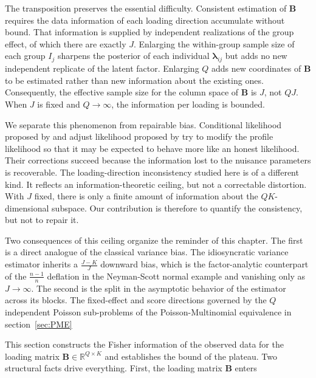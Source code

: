 The transposition preserves the essential difficulty. Consistent estimation of $\mathbf{B}$ requires the data information of each loading direction accumulate without bound. That information is supplied by independent realizations of the group effect, of which there are exactly $J$. Enlarging the within-group sample size of each group $I_{j}$ sharpens the posterior of each individual $\bm{\lambda}_{ij}$ but adds no new independent replicate of the latent factor. Enlarging $Q$ adds new coordinates of $\mathbf{B}$ to be estimated rather than new information about the existing ones. Consequently, the effective sample size for the column space of $\mathbf{B}$ is $J$, not $QJ$. When $J$ is fixed and $Q\to\infty$, the information per loading is bounded.

We separate this phenomenon from repairable bias. Conditional likelihood proposed by \citet{10.1093/biomet/74.4.695} and adjust likelihood proposed by \citet{10.1111/j.2517-6161.1990.tb01790.x} try to modify the profile likelihood so that it may be expected to behave more like an honest likelihood. Their corrections succeed because the information lost to the nuisance parameters is recoverable. The loading-direction inconsistency studied here is of a different kind. It reflects an information-theoretic ceiling, but not a correctable distortion. With $J$ fixed, there is only a finite amount of information about the $QK$-dimensional subspace. Our contribution is therefore to quantify the consistency, but not to repair it.

Two consequences of this ceiling organize the reminder of this chapter. The first is a direct analogue of the classical variance bias. The idiosyncratic variance estimator inherits a $\frac{J-K}{J}$ downward bias, which is the factor-analytic counterpart of the $\frac{n-1}{n}$ deflation in the Neyman-Scott normal example and vanishing only as $J\to\infty$. The second is the split in the asymptotic behavior of the estimator across its blocks. The fixed-effect and score directions governed by the $Q$ independent Poisson sub-problems of the Poisson-Multinomial equivalence in section~\ref{sec:PME}

This section constructs the Fisher information of the observed data for the loading matrix $\mathbf{B}\in\mathbb{R}^{Q\times K}$ and establishes the bound of the plateau. Two structural facts drive everything. First, the loading matrix $\mathbf{B}$ enters 

